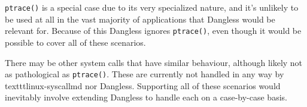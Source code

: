 \lstinline!ptrace()! is a special case due to its very specialized nature, and it's unlikely to be used at all in the vast majority of applications that Dangless would be relevant for. Because of this Dangless ignores \lstinline!ptrace()!, even though it would be possible to cover all of these scenarios.

There may be other system calls that have similar behaviour, although likely not as pathological as \lstinline!ptrace()!. These are currently not handled in any way by texttt{linux-syscallmd} nor Dangless. Supporting all of these scenarios would inevitably involve extending Dangless to handle each on a case-by-case basis.


